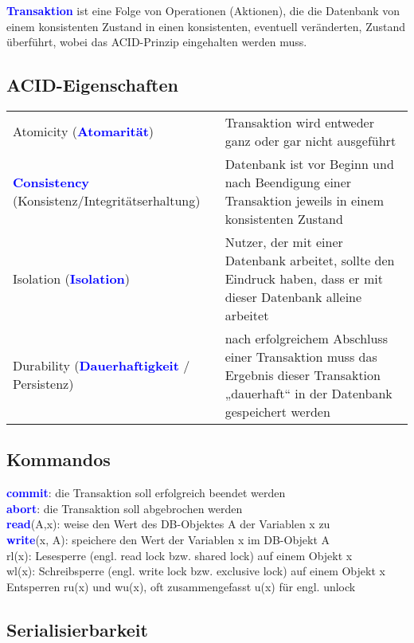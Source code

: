 \documentclass{scrartcl}
\newcommand{\key}[1]{{\textcolor{blue}{\textbf{#1}}}}
\begin{document}
\key{Transaktion} ist eine Folge von Operationen (Aktionen), die die Datenbank von einem konsistenten Zustand in einen konsistenten, eventuell veränderten, Zustand überführt, wobei das ACID-Prinzip eingehalten werden muss.

\subsection{ACID-Eigenschaften}

\begin{tabular}{p{7cm}p{11cm}}
	Atomicity (\key{Atomarität}) & Transaktion wird entweder ganz oder gar nicht ausgeführt \\
	\key{Consistency} (Konsistenz/Integritätserhaltung) & Datenbank ist vor Beginn und nach Beendigung einer Transaktion jeweils in einem konsistenten Zustand \\
	Isolation (\key{Isolation})& 	Nutzer, der mit einer Datenbank arbeitet, sollte den Eindruck haben, dass er mit dieser Datenbank alleine arbeitet \\
	Durability (\key{Dauerhaftigkeit} / Persistenz) & nach erfolgreichem Abschluss einer Transaktion muss das Ergebnis dieser Transaktion „dauerhaft“ in der Datenbank gespeichert werden \\
\end{tabular}

\subsection{Kommandos}

\key{commit}: die Transaktion soll erfolgreich beendet werden \\
\key{abort}: die Transaktion soll abgebrochen werden \\
\key{read}(A,x): weise den Wert des DB-Objektes A der Variablen x zu \\
\key{write}(x, A): speichere den Wert der Variablen x im DB-Objekt A   \\
rl(x): Lesesperre (engl. read lock bzw. shared lock) auf einem Objekt x \\
wl(x): Schreibsperre (engl. write lock bzw. exclusive lock) auf einem Objekt x \\
Entsperren ru(x) und wu(x), oft zusammengefasst u(x) für engl. unlock 

\subsection{Serialisierbarkeit}
\end{document}
